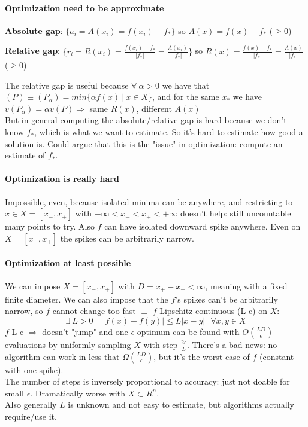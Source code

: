 \documentclass[10pt]{report}
\begin{document}
\paragraph{Optimization need to be approximate} \begin{list}{}{}
	\item \textbf{Absolute gap}: $\{a_i = A(x_i) = f(x_i) - f_*\}$ so $A(x) = f(x) - f_*$ ($\geq 0$)
	\item \textbf{Relative gap}: $\{r_i = R(x_i) = \frac{f(x_i) - f_*}{|f_*|} = \frac{A(x_i)}{|f_*|}\}$ so $R(x) = \frac{f(x) - f_*}{|f_*|} = \frac{A(x)}{|f_*|}$ ($\geq 0$)
\end{list}
The relative gap is useful because $\forall\:\alpha>0$ we have that $(P)\equiv (P_\alpha) = min\{\alpha f(x)\:|\:x\in X\}$, and for the same $x_*$ we have $v(P_\alpha) = \alpha v(P) \Rightarrow$ same $R(x)$, different $A(x)$\\
But in general computing the absolute/relative gap is hard because we don't know $f_*$, which is what we want to estimate. So it's hard to estimate how good a solution is. Could argue that this is the "issue" in optimization: compute an estimate of $f_*$.
\paragraph{Optimization is really hard} Impossible, even, because isolated minima can be anywhere, and restricting to $x\in X=[x_-, x_+]$ with $-\infty<x_-<x_+<+\infty$ doesn't help: still uncountable many points to try. Also $f$ can have isolated downward spike anywhere. Even on $X = [x_-, x_+]$ the spikes can be arbitrarily narrow.
\paragraph{Optimization at least possible} We can impose $X=[x_-,x_+]$ with $D = x_+-x_-<\infty$, meaning with a fixed finite diameter. We can also impose that the $f$'s spikes can't be arbitrarily narrow, so $f$ cannot change too fast $\equiv$ $f$ Lipschitz continuous (L-c) on $X$: $$\exists\: L > 0\:|\:\:\:|f(x) - f(y)| \leq L|x - y|\:\:\:\forall x,y\in X$$
$f$ L-c $\Rightarrow$ doesn't "jump" and one $\epsilon$-optimum can be found with $O(\frac{LD}{\epsilon})$ evaluations by uniformly sampling $X$ with step $\frac{2\epsilon}{L}$. There's a bad news: no algorithm can work in less that $\Omega(\frac{LD}{\epsilon})$, but it's the worst case of $f$ (constant with one spike).\\
The number of steps is inversely proportional to accuracy: just not doable for small $\epsilon$. Dramatically worse with $X\subset R^n$.\\
Also generally $L$ is unknown and not easy to estimate, but algorithms actually require/use it.
\end{document}
